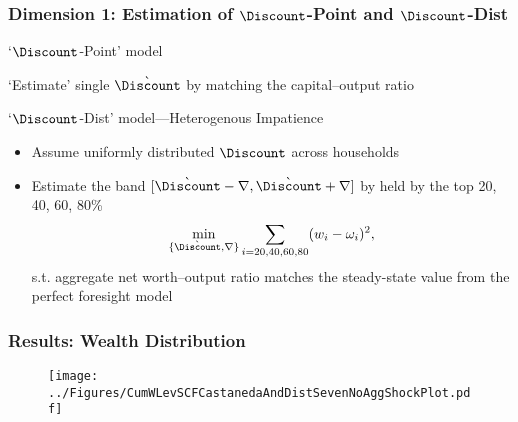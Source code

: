 \begin{frame}
\frametitle{{Dimension 1: Estimation of $\Discount$-Point and $\Discount$-Dist}}

\begin{footnotesize}
\begin{block}{`$\Discount$-Point' model}
\bi
\item `Estimate' single $\grave{\Discount}$ by matching the capital--output ratio
\ei
\end{block}
\begin{block}{`$\Discount$-Dist' model---Heterogenous Impatience}
\begin{itemize}
\item Assume uniformly distributed $\Discount$ across households
\item Estimate the band $[\grave{\Discount}-\nabla,\grave{\Discount}+\nabla]$ by  held by the top 20, 40, 60, 80\%
        \begin{equation*}
        \underset{\{\grave{\Discount}, \nabla\}}{\min}\sum\limits_{i=20,40,60,80}(w_{i}-\omega _{i})^{2}\notag,
        \end{equation*}
        s.t. aggregate net worth--output ratio matches the steady-state value from the perfect foresight model\\[2mm]
\end{itemize}
\end{block}
\end{footnotesize}

\end{frame}


\begin{frame}
\frametitle{{Results: Wealth Distribution}}

\begin{figure}
\centering
\texttt{[image: ../Figures/CumWLevSCFCastanedaAndDistSevenNoAggShockPlot.pdf]}
\label{CumWLevSCFCastanedaAndDistSevenNoAggShockPlot}
\end{figure}

\end{frame}



